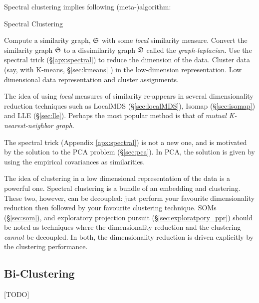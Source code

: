 Spectral clustering implies following (meta-)algorithm:
\begin{algorithm}[H]
\caption{Spectral Clustering}
\begin{algorithmic}
\State Compute a similarity graph, $\mathfrak{S}$ with some \emph{local} similarity measure.
\State Convert the similarity graph $\mathfrak{S}$ to a dissimilarity graph $\mathfrak{D}$ called the \emph{graph-laplacian}.
\State Use the spectral trick (\S\ref{apx:spectral}) to reduce the dimension of the data.
\State Cluster data (say, with K-means, \S\ref{sec:kmeans} ) in the low-dimension representation. 
\State \Return Low dimensional data representation and cluster assignments. 
\end{algorithmic}
\end{algorithm}



The idea of using \emph{local} measures of similarity re-appears in several dimensionality reduction techniques such as LocalMDS (\S\ref{sec:localMDS}), Isomap (\S\ref{sec:isomap}) and LLE (\S\ref{sec:lle}).
Perhaps the most popular method is that of \emph{mutual K-nearest-neighbor graph}.

The spectral trick (Appendix \ref{apx:spectral}) is not a new one, and is motivated by the solution to the PCA problem (\S\ref{sec:pca}). In PCA, the solution is given by using the empirical covariances as similarities. 

The idea of clustering in a low dimensional representation of the data is a powerful one. 
Spectral clustering is a bundle of an embedding and clustering. 
These two, however, can be decoupled: just perform your favourite dimensionality reduction then followed by your favourite clustering technique.
SOMs (\S\ref{sec:som}), and exploratory projection pursuit (\S\ref{sec:exploratpory_ppr}) should be noted as techniques where the dimensionality reduction and the clustering \emph{cannot} be decoupled. In both, the dimensionality reduction is driven explicitly by the clustering performance.  


\subsection{Bi-Clustering}
[TODO]
\label{sec:bi_clustering}